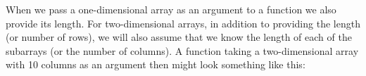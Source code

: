 
When we pass a one-dimensional array as an argument to a function we also provide its length. For two-dimensional arrays, in addition to providing the length (or number of rows), we will also assume that we know the length of each of the subarrays (or the number of columns). A function taking a two-dimensional array with 10 columns as an argument then might look something like this:

